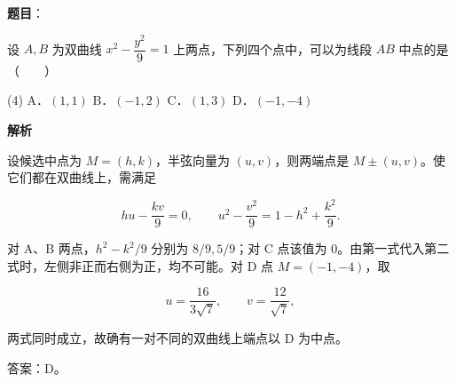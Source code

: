 \begin{answer}

\textbf{题目}：

设 $A,B$ 为双曲线 $x^2-\dfrac{y^2}{9}=1$ 上两点，下列四个点中，可以为线段 $AB$ 中点的是\mbox{（　　）}

\begin{gkopts}(4)
\task A．$(1,1)$
\task B．$(-1,2)$
\task C．$(1,3)$
\task D．$(-1,-4)$
\end{gkopts}

\textbf{解析}

设候选中点为 $M=(h,k)$，半弦向量为 $(u,v)$，则两端点是 $M\pm(u,v)$。使它们都在双曲线上，需满足

\nopagebreak[4]
\[
hu-\frac{kv}{9}=0,\qquad
u^2-\frac{v^2}{9}=1-h^2+\frac{k^2}{9}.
\]

对 A、B 两点，$h^2-k^2/9$ 分别为 $8/9,5/9$；对 C 点该值为 $0$。由第一式代入第二式时，左侧非正而右侧为正，均不可能。对 D 点 $M=(-1,-4)$，取

\nopagebreak[4]
\[
u=\frac{16}{3\sqrt7},\qquad v=\frac{12}{\sqrt7},
\]

两式同时成立，故确有一对不同的双曲线上端点以 D 为中点。

答案：D。


\end{answer}

